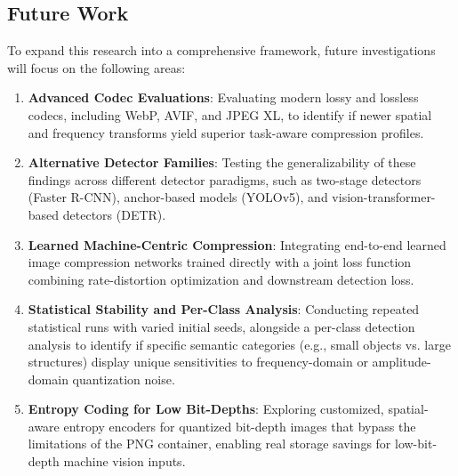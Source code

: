 \documentclass[12pt, a4paper]{article}
\begin{document}
\subsection{Future Work}
To expand this research into a comprehensive framework, future investigations will focus on the following areas:
\begin{enumerate}
    \item \textbf{Advanced Codec Evaluations}: Evaluating modern lossy and lossless codecs, including WebP, AVIF, and JPEG XL, to identify if newer spatial and frequency transforms yield superior task-aware compression profiles.
    \item \textbf{Alternative Detector Families}: Testing the generalizability of these findings across different detector paradigms, such as two-stage detectors (Faster R-CNN), anchor-based models (YOLOv5), and vision-transformer-based detectors (DETR).
    \item \textbf{Learned Machine-Centric Compression}: Integrating end-to-end learned image compression networks trained directly with a joint loss function combining rate-distortion optimization and downstream detection loss.
    \item \textbf{Statistical Stability and Per-Class Analysis}: Conducting repeated statistical runs with varied initial seeds, alongside a per-class detection analysis to identify if specific semantic categories (e.g., small objects vs. large structures) display unique sensitivities to frequency-domain or amplitude-domain quantization noise.
    \item \textbf{Entropy Coding for Low Bit-Depths}: Exploring customized, spatial-aware entropy encoders for quantized bit-depth images that bypass the limitations of the PNG container, enabling real storage savings for low-bit-depth machine vision inputs.
\end{enumerate}
\end{document}
